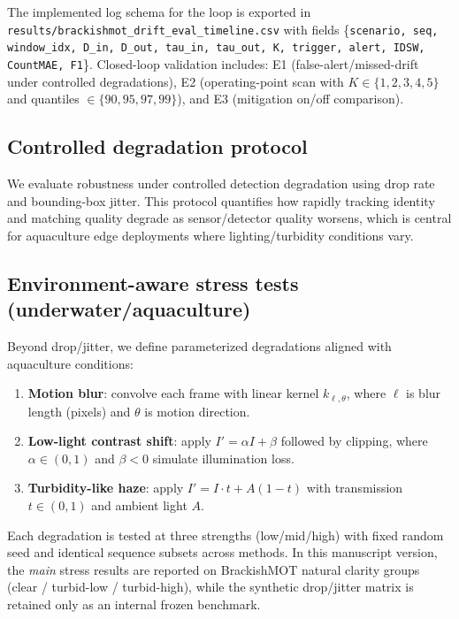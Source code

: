 \documentclass[5p,twocolumn,a4paper]{elsarticle}
\begin{document}
The implemented log schema for the loop is exported in \texttt{results/brackishmot\_drift\_eval\_timeline.csv} with fields
\{\texttt{scenario, seq, window\_idx, D\_in, D\_out, tau\_in, tau\_out, K, trigger, alert, IDSW, CountMAE, F1}\}.
Closed-loop validation includes: E1 (false-alert/missed-drift under controlled degradations), E2 (operating-point scan with $K \in \{1,2,3,4,5\}$ and quantiles $\in \{90,95,97,99\}$), and E3 (mitigation on/off comparison).

\subsection{Controlled degradation protocol}
We evaluate robustness under controlled detection degradation using drop rate and bounding-box jitter. This protocol quantifies how rapidly tracking identity and matching quality degrade as sensor/detector quality worsens, which is central for aquaculture edge deployments where lighting/turbidity conditions vary.

\subsection{Environment-aware stress tests (underwater/aquaculture)}
Beyond drop/jitter, we define parameterized degradations aligned with aquaculture conditions:
\begin{enumerate}
  \item \textbf{Motion blur}: convolve each frame with linear kernel $k_{\ell,\theta}$, where $\ell$ is blur length (pixels) and $\theta$ is motion direction.
  \item \textbf{Low-light contrast shift}: apply $I'=\alpha I+\beta$ followed by clipping, where $\alpha\in(0,1)$ and $\beta<0$ simulate illumination loss.
  \item \textbf{Turbidity-like haze}: apply $I' = I \cdot t + A(1-t)$ with transmission $t\in(0,1)$ and ambient light $A$.
\end{enumerate}

Each degradation is tested at three strengths (low/mid/high) with fixed random seed and identical sequence subsets across methods. In this manuscript version, the \emph{main} stress results are reported on BrackishMOT natural clarity groups (clear / turbid-low / turbid-high), while the synthetic drop/jitter matrix is retained only as an internal frozen benchmark.
\begin{table}[t]
\centering
\caption{Environmental stress-test parameter settings (fixed and logged).}
\label{tab:stress_param_settings}

\end{table}
\end{document}
